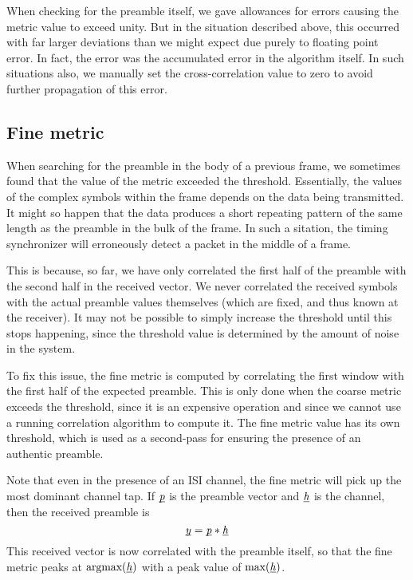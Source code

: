 When checking for the preamble itself, we gave allowances for errors causing
the metric value to exceed unity. But in the situation described above, this
occurred with far larger deviations than we might expect due purely to floating
point error. In fact, the error was the accumulated error in the algorithm
itself. In such situations also, we manually set the cross-correlation value to
zero to avoid further propagation of this error.


\subsection{Fine metric}

When searching for the preamble in the body of a previous frame, we sometimes
found that the value of the metric exceeded the threshold. Essentially, the
values of the complex symbols within the frame depends on the data being
transmitted. It might so happen that the data produces a short repeating
pattern of the same length as the preamble in the bulk of the frame. In such a
sitation, the timing synchronizer will erroneously detect a packet in the
middle of a frame.

This is because, so far, we have only correlated the first half of the preamble
with the second half in the received vector. We never correlated the received
symbols with the actual preamble values themselves (which are fixed, and thus
known at the receiver). It may not be possible to simply increase the threshold
until this stops happening, since the threshold value is determined by the
amount of noise in the system. %

To fix this issue, the fine metric is computed by correlating the first window
with the first half of the expected preamble. This is only done when the coarse
metric exceeds the threshold, since it is an expensive operation and since we
cannot use a running correlation algorithm to compute it. The fine metric value
has its own threshold, which is used as a second-pass for ensuring the presence
of an authentic preamble.

Note that even in the presence of an ISI channel, the fine metric will pick up
the most dominant channel tap. If $\underbar{\emph{p}}$ is the preamble vector and $\underbar{\emph{h}}$
is the channel, then the received preamble is
$$\underbar{\emph{y}} = \underbar{\emph{p}} * \underbar{\emph{h}}$$
This received vector is now correlated with the preamble itself, so that the
fine metric peaks at $\text{argmax}(\underbar{\emph{h}})$ with a peak value of
$\text{max}(\underbar{\emph{h}})$.

